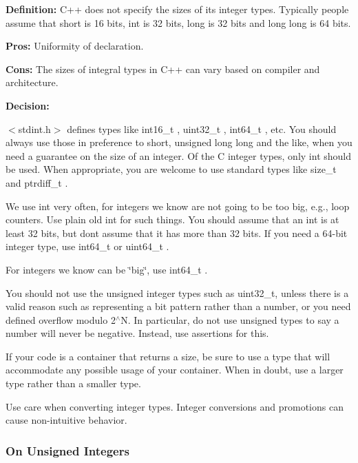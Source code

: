 {\bfseries Definition\+:} C++ does not specify the sizes of its integer types. Typically people assume that {\ttfamily short} is 16 bits, {\ttfamily int} is 32 bits, {\ttfamily long} is 32 bits and {\ttfamily long long} is 64 bits.

{\bfseries Pros\+:} Uniformity of declaration.

{\bfseries Cons\+:} The sizes of integral types in C++ can vary based on compiler and architecture.

{\bfseries Decision\+:}

{\ttfamily $<$stdint.\+h$>$} defines types like {\ttfamily int16\+\_\+t} , {\ttfamily uint32\+\_\+t} , {\ttfamily int64\+\_\+t} , etc. You should always use those in preference to {\ttfamily short}, {\ttfamily unsigned long long} and the like, when you need a guarantee on the size of an integer. Of the C integer types, only int should be used. When appropriate, you are welcome to use standard types like {\ttfamily size\+\_\+t} and {\ttfamily ptrdiff\+\_\+t} .

We use {\ttfamily int} very often, for integers we know are not going to be too big, e.\+g., loop counters. Use plain old {\ttfamily int} for such things. You should assume that an {\ttfamily int} is at least 32 bits, but don\textquotesingle{}t assume that it has more than 32 bits. If you need a 64-\/bit integer type, use {\ttfamily int64\+\_\+t} or {\ttfamily uint64\+\_\+t} .

For integers we know can be \char`\"{}big\char`\"{}, use {\ttfamily int64\+\_\+t} .

You should not use the unsigned integer types such as {\ttfamily uint32\+\_\+t}, unless there is a valid reason such as representing a bit pattern rather than a number, or you need defined overflow modulo 2$^\wedge$N. In particular, do not use unsigned types to say a number will never be negative. Instead, use assertions for this.

If your code is a container that returns a size, be sure to use a type that will accommodate any possible usage of your container. When in doubt, use a larger type rather than a smaller type.

Use care when converting integer types. Integer conversions and promotions can cause non-\/intuitive behavior.

\subsubsection*{On Unsigned Integers}

